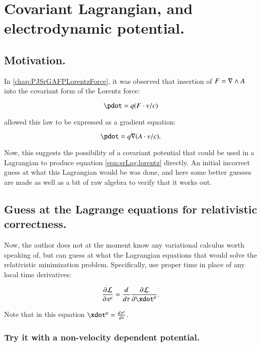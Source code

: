 \chapter{Covariant Lagrangian, and electrodynamic potential.}\label{chap:PJSrLagrangian}

\section{Motivation. }

In \ref{chap:PJSrGAFPLorentzForce}, it was observed that insertion of $F = \nabla \wedge A$ into
the covariant form of the Lorentz force:

\begin{equation}\label{eqn:srLag:lorentz}
\pdot = q (F \cdot v/c)
\end{equation}

allowed this law to be expressed as a gradient equation:

\begin{equation}
\pdot = q \grad (A \cdot v/c).
\end{equation}

Now, this suggests the possibility of a covariant potential that could be 
used in a Lagrangian to produce equation \ref{eqn:srLag:lorentz} directly.  An
initial incorrect guess at what this Lagrangian would be was done, and
here some better guesses are made as well as a bit of raw algebra to verify
that it works out.

\section{Guess at the Lagrange equations for relativistic correctness. }

Now, the author does not at the moment know any variational calculus worth
speaking of, but can guess at what the Lagrangian equations that would 
solve the relativistic minimization problem.  Specifically, use proper
time in place of any local time derivatives:

\begin{equation}\label{eqn:srLag:properLagrange}
\frac{\partial \mathcal{L}}{\partial x^{\mu}} = 
\frac{d}{d\tau} \frac{\partial \mathcal{L}}{\partial \xdot^{\mu}}.
\end{equation}

Note that in this equation $\xdot^{\mu} = \frac{d x^{\mu}}{d\tau}$.

\subsection{Try it with a non-velocity dependent potential. }

